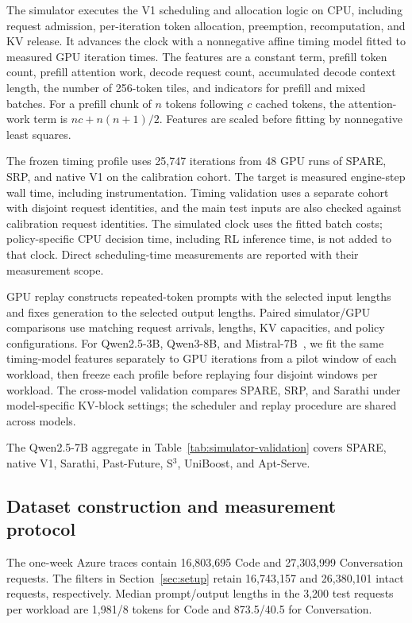 The simulator executes the V1 scheduling and allocation logic on CPU, including request admission, per-iteration token allocation, preemption, recomputation, and KV release. It advances the clock with a nonnegative affine timing model fitted to measured GPU iteration times. The features are a constant term, prefill token count, prefill attention work, decode request count, accumulated decode context length, the number of 256-token tiles, and indicators for prefill and mixed batches. For a prefill chunk of $n$ tokens following $c$ cached tokens, the attention-work term is $nc+n(n+1)/2$. Features are scaled before fitting by nonnegative least squares.

The frozen timing profile uses 25,747 iterations from 48 GPU runs of SPARE, SRP, and native V1 on the calibration cohort. The target is measured engine-step wall time, including instrumentation. Timing validation uses a separate cohort with disjoint request identities, and the main test inputs are also checked against calibration request identities. The simulated clock uses the fitted batch costs; policy-specific CPU decision time, including RL inference time, is not added to that clock. Direct scheduling-time measurements are reported with their measurement scope.

GPU replay constructs repeated-token prompts with the selected input lengths and fixes generation to the selected output lengths. Paired simulator/GPU comparisons use matching request arrivals, lengths, KV capacities, and policy configurations.
For Qwen2.5-3B, Qwen3-8B, and Mistral-7B~\cite{spare_qwen,yang2025qwen3,jiang2023mistral}, we fit the same timing-model features separately to GPU iterations from a pilot window of each workload, then freeze each profile before replaying four disjoint windows per workload. The cross-model validation compares SPARE, SRP, and Sarathi under model-specific KV-block settings; the scheduler and replay procedure are shared across models.

The Qwen2.5-7B aggregate in Table~\ref{tab:simulator-validation} covers SPARE, native V1, Sarathi, Past-Future, S$^3$, UniBoost, and Apt-Serve. 

\subsection{Dataset construction and measurement protocol}
\label{app:experimental-protocol}

The one-week Azure traces contain 16,803,695 Code and 27,303,999 Conversation requests. The filters in Section~\ref{sec:setup} retain 16,743,157 and 26,380,101 intact requests, respectively. Median prompt/output lengths in the 3,200 test requests per workload are 1,981/8 tokens for Code and 873.5/40.5 for Conversation.

